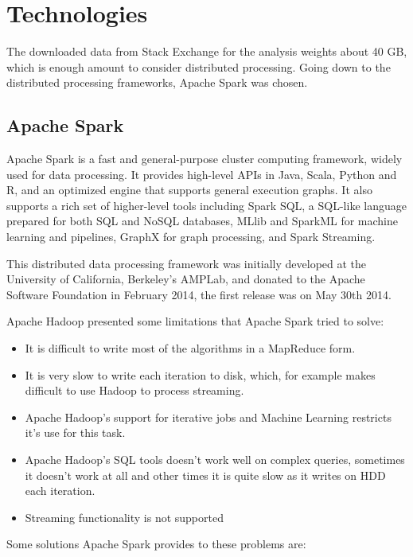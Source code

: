 \documentclass[11pt]{book} %
\begin{document}
\newpage

\chapter{Technologies}
  \label{sec:technologies}

  The downloaded data from Stack Exchange for the analysis weights about 40 GB, which is enough amount to consider distributed processing. Going down to the distributed processing frameworks, Apache Spark was chosen.

  \section{Apache Spark}

    Apache Spark is a fast and general-purpose cluster computing framework, widely used for data processing. It provides high-level APIs in Java, Scala, Python and R, and an optimized engine that supports general execution graphs. It also supports a rich set of higher-level tools including Spark SQL, a SQL-like language prepared for both SQL and NoSQL databases, MLlib and SparkML for machine learning and pipelines, GraphX for graph processing, and Spark Streaming.

    This distributed data processing framework was initially developed at the University of California, Berkeley's AMPLab, and donated to the Apache Software Foundation in February 2014, the first release was on May 30th 2014.

    Apache Hadoop presented some limitations that Apache Spark tried to solve:

    \begin{itemize}
      \item It is difficult to write most of the algorithms in a MapReduce form.
      \item It is very slow to write each iteration to disk, which, for example makes difficult to use Hadoop to process streaming.
      \item Apache Hadoop's support for iterative jobs and Machine Learning restricts it's use for this task.
      \item Apache Hadoop's SQL tools doesn't work well on complex queries, sometimes it doesn't work at all and other times it is quite slow as it writes on HDD each iteration.
      \item Streaming functionality is not supported
    \end{itemize}

    Some solutions Apache Spark provides to these problems are:
\end{document}
